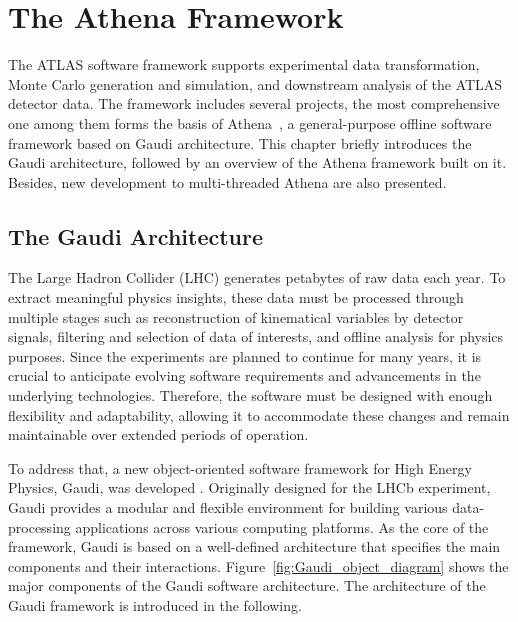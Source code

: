\chapter{The Athena Framework} \label{ch:Athena}
The ATLAS software framework supports experimental data transformation, Monte Carlo generation and simulation, and downstream analysis of the ATLAS detector data. The framework includes several projects, the most comprehensive one among them forms the basis of Athena~\cite{ATLAScomputing2025}, a general-purpose offline software framework based on Gaudi architecture. This chapter briefly introduces the Gaudi architecture, followed by an overview of the Athena framework built on it. Besides, new development to multi-threaded Athena are also presented.
\section{The Gaudi Architecture} \label{sec:Gaudi}
The Large Hadron Collider (LHC) generates petabytes of raw data each year. To extract meaningful physics insights, these data must be processed through multiple stages such as reconstruction of kinematical variables by detector signals, filtering and selection of data of interests, and offline analysis for physics purposes. Since the experiments are planned to continue for many years, it is crucial to anticipate evolving software requirements and advancements in the underlying technologies. Therefore, the software must be designed with enough flexibility and adaptability, allowing it to accommodate these changes and remain maintainable over extended periods of operation.

To address that, a new object-oriented software framework for High Energy Physics, Gaudi, was developed \cite{Gaudi}. Originally designed for the LHCb experiment, Gaudi provides a modular and flexible environment for building various data-processing applications across various computing platforms. As the core of the framework, Gaudi is based on a well-defined architecture that specifies the main components and their interactions. Figure~\ref{fig:Gaudi_object_diagram} shows the major components of the Gaudi software architecture. The architecture of the Gaudi framework is introduced in the following.

